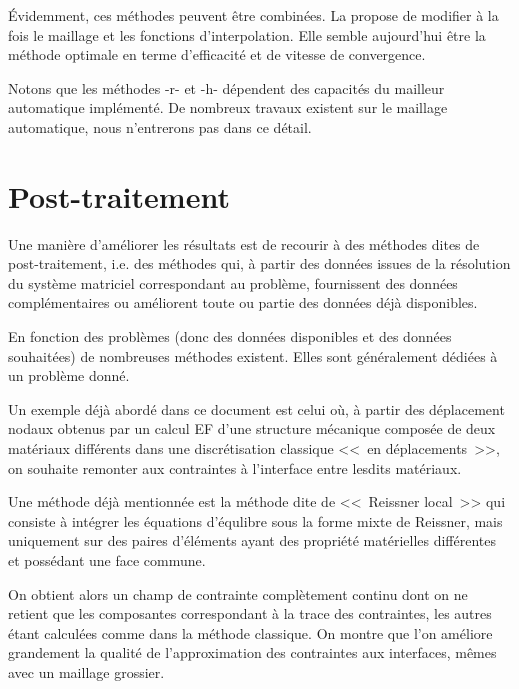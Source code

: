 \medskip
Évidemment, ces méthodes peuvent être combinées.
La  propose de modifier à la fois le maillage et
les fonctions d'interpolation. Elle semble aujourd'hui être la méthode optimale en terme
d'efficacité et de vitesse de convergence.

Notons que les méthodes -r- et -h- dépendent des capacités du mailleur automatique
implémenté.
De nombreux travaux existent sur le maillage automatique, nous n'entrerons pas dans
ce détail.





\medskip
\section{Post-traitement}\label{Sec-PT}

Une manière d'améliorer les résultats est de recourir à des méthodes dites
de post-traitement, i.e. des méthodes qui, à partir des données issues de la
résolution du système matriciel correspondant au problème, fournissent
des données complémentaires ou améliorent toute ou partie des données
déjà disponibles.

En fonction des problèmes (donc des données disponibles et des données
souhaitées) de nombreuses méthodes existent. Elles sont généralement
dédiées à un problème donné.

\medskip
Un exemple déjà abordé dans ce document est celui où, à partir des déplacement
nodaux obtenus par un calcul EF d'une structure mécanique composée de deux matériaux
différents dans une discrétisation classique <<~en déplacements~>>, on souhaite remonter
aux contraintes à l'interface entre lesdits matériaux.

Une méthode déjà mentionnée est la méthode dite de <<~Reissner local~>>
qui consiste à intégrer les équations d'équlibre sous la forme mixte de Reissner,
mais uniquement sur des paires d'éléments ayant des propriété matérielles différentes
et possédant une face commune.

On obtient alors un champ de contrainte complètement continu dont on ne retient que
les composantes correspondant à la trace des contraintes, les autres étant calculées
comme dans la méthode classique. On montre que l'on améliore grandement la qualité
de l'approximation des contraintes aux interfaces, mêmes avec un maillage grossier.

